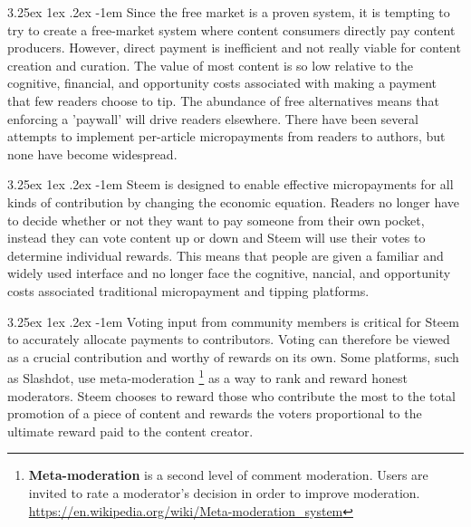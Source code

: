 \documentclass{article}
\makeatletter
\renewcommand\paragraph{\@startsection{paragraph}{5}{\z@}%
  {3.25ex \@plus1ex \@minus.2ex}%
  {-1em}%
  {\normalfont\normalsize\bfseries}}
\makeatother
\begin{document}
            \paragraph{}
                Since the free market is a proven system, it is tempting to
try to create a free-market system where content consumers directly pay
content producers. However, direct payment is inefficient and not really
viable for content creation and curation. The value of most content is so
low relative to the cognitive, financial, and opportunity costs associated
with making a payment that few readers choose to tip. The abundance of free
alternatives means that enforcing a 'paywall' will drive readers elsewhere.
There have been several attempts to implement per-article micropayments
from readers to authors, but none have become widespread.

            \paragraph{}
                Steem is designed to enable effective micropayments for all
kinds of contribution by changing the economic equation. Readers no longer
have to decide whether or not they want to pay someone from their own
pocket, instead they can vote content up or down and Steem will use their
votes to determine individual rewards. This means that people are given a
familiar and widely used interface and no longer face the cognitive,
nancial, and opportunity costs associated traditional micropayment and
tipping platforms.

            \paragraph{}
                Voting input from community members is critical for Steem
to accurately allocate payments to contributors. Voting can therefore be
viewed as a crucial contribution and worthy of rewards on its own. Some
platforms, such as Slashdot, use meta-moderation
\footnote{\textbf{Meta-moderation} is a second level of comment moderation.
Users are invited to rate a moderator's decision in order to improve
moderation.
\newline\url{https://en.wikipedia.org/wiki/Meta-moderation_system}} as a
way to rank and reward honest moderators. Steem chooses to reward those who
contribute the most to the total promotion of a piece of content and
rewards the voters proportional to the ultimate reward paid to the content
creator.
\end{document}
